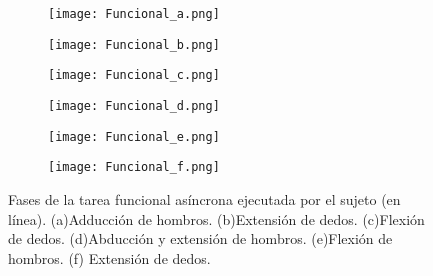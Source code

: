 \begin{figure}[htbp]
	\centering
	\begin{subfigure}[htbp]{0.45\textwidth}
		\texttt{[image: Funcional\_a.png]}
		\caption{}
		\label{Figura: Fun_A}
	\end{subfigure}
	\begin{subfigure}[htbp]{0.45\textwidth}
		\texttt{[image: Funcional\_b.png]}
		\caption{}
		\label{Figura: Fun_B}
	\end{subfigure}
	\newline
	\begin{subfigure}[htbp]{0.45\textwidth}
		\texttt{[image: Funcional\_c.png]}
		\caption{}
		\label{Figura: Fun_C}
	\end{subfigure}
	\begin{subfigure}[htbp]{0.45\textwidth}
		\texttt{[image: Funcional\_d.png]}
		\caption{}
		\label{Figura: Fun_D}
	\end{subfigure}
	\newline
	\begin{subfigure}[htbp]{0.45\textwidth}
		\texttt{[image: Funcional\_e.png]}
		\caption{}
		\label{Figura: Fun_E}
	\end{subfigure}
	\begin{subfigure}[htbp]{0.45\textwidth}
		\texttt{[image: Funcional\_f.png]}
		\caption{}
		\label{Figura: Fun_F}
	\end{subfigure}
	\caption[Fases de la tarea funcional asíncrona ejecutada por el sujeto (en línea)]{Fases de la tarea funcional asíncrona ejecutada por el sujeto (en línea). (a)Adducción de hombros. (b)Extensión de dedos. (c)Flexión de dedos. (d)Abducción y extensión de hombros. (e)Flexión de hombros. (f) Extensión de dedos.}
	\label{Figura: TareaFuncional}
\end{figure}

